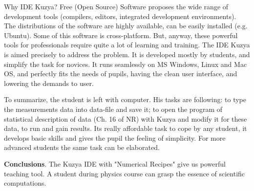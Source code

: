 \documentclass[10pt, a5paper]{article}
\begin{document}
Why IDE Kuzya? Free (Open Source) Software proposes the wide range of development tools (compilers, editors, integrated development environments). The distributions of the software are highly available, can be easily installed (e.g. Ubuntu). Some of this software is cross-platform. But, anyway, these powerful tools for professionals require quite a lot of learning and training. The IDE Kuzya is aimed precisely to address the problem. It is  developed mostly by students, and simplify the task for novices. It runs seamlessly on MS Windows, Linux and Mac OS, and perfectly fits the needs of pupils, having the clean user interface, and lowering the demands to user.

To summarize, the student is left with computer. His tasks are following: to type the measurements data into data-file and save it; to open the program of statistical description of data (Ch. 16 of NR) with Kuzya and modify it for these data, to run and gain results. Its really affordable task to cope by any student, it develops basic skills and gives the pupil the feeling of simplicity. For more advanced students the same task can be elaborated. 
 
{\bf Conclusions}. The Kuzya IDE with "Numerical Recipes" give us powerful teaching tool. A student during physics course can grasp the essence of scientific computations.
\end{document}
